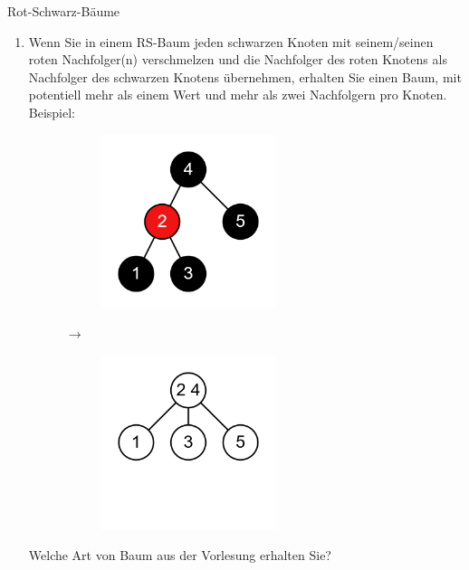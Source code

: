 \documentclass[11pt,a4paper]{article}
\begin{document}
\begin{aufgabe}{2}{Rot-Schwarz-Bäume}
\begin{enumerate}
        \item \hard Wenn Sie in einem RS-Baum jeden schwarzen Knoten mit seinem/seinen roten Nachfolger(n) verschmelzen und die Nachfolger des roten Knotens als Nachfolger des schwarzen Knotens übernehmen, erhalten Sie einen Baum, mit potentiell mehr als einem Wert und mehr als zwei Nachfolgern pro Knoten.
        Beispiel:
        \begin{figure}[h!]
            \centering
            \begin{subfigure}[c]{0.2\textwidth}
                \centering
                \includegraphics[width=0.6\textwidth]{img/2d_1}
            \end{subfigure}
            $\rightarrow$
            \begin{subfigure}[c]{0.2\textwidth}
                \centering
                \includegraphics[width=0.6\textwidth]{img/2d_2}
            \end{subfigure}
        \end{figure}
        \FloatBarrier
        Welche Art von Baum aus der Vorlesung erhalten Sie?

\end{enumerate}
\end{aufgabe}
\end{document}
